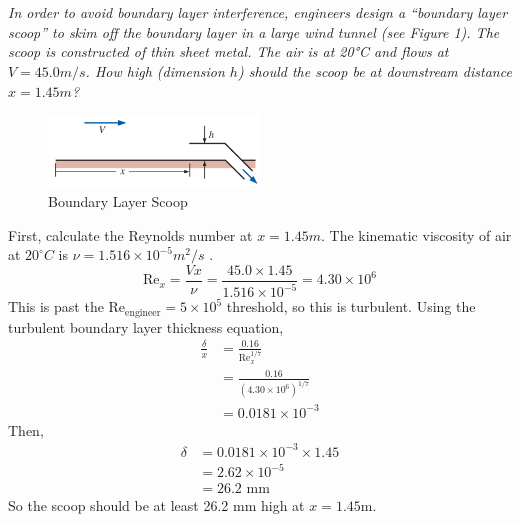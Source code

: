 \section{}

\textit{In order to avoid boundary layer interference, engineers design a “boundary layer scoop” to skim off the boundary layer in a large wind tunnel (see Figure 1). The scoop is constructed of thin sheet metal. The air is at 20°C and flows at $V = 45.0 m/s$. How high (dimension $h$) should the scoop be at downstream distance $x = 1.45 m$?}

\begin{figure}[H]
    \centering
    \includegraphics[width=0.5\textwidth]{Questions/Figures/Q2 Problem Diagram.png}
    \caption{Boundary Layer Scoop}
\end{figure}

First, calculate the Reynolds number at $x = 1.45 m$. The kinematic viscosity of air at $20^\circ C$ is $\nu = 1.516 \times 10^{-5} m^2/s$ \cite{cengel_fluid_2018}.
\begin{equation*}
    \text{Re}_x = \frac{Vx}{\nu} = \frac{45.0 \times 1.45}{1.516 \times 10^{-5}} = 4.30 \times 10^6
\end{equation*}
This is past the $\text{Re}_{\text{engineer}} = 5 \times 10^5$ threshold, so this is turbulent. Using the turbulent boundary layer thickness equation,
\begin{align*}
    \frac{\delta}{x} &= \frac{0.16}{\text{Re}_x^{1/7}} \\
    &= \frac{0.16}{(4.30 \times 10^6)^{1/7}} \\
    &= 0.0181 \times 10^{-3} 
\end{align*}
Then,
\begin{align*}
    \delta &= 0.0181 \times 10^{-3} \times 1.45 \\
    &= 2.62 \times 10^{-5} \\
    &= \boxed{26.2 \text{ mm}}
\end{align*}
So the scoop should be at least 26.2 mm high at $x = 1.45$m.